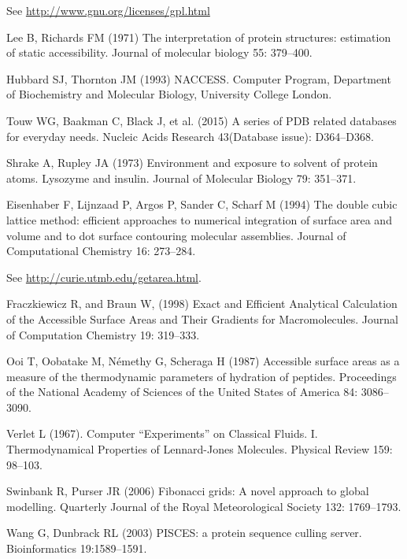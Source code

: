\documentclass[a4paper,11pt]{article}
\begin{document}
\begin{small}
  
\begin{thebibliography}{50}

  See  \url{http://www.gnu.org/licenses/gpl.html}

  Lee B, Richards FM (1971) The interpretation of protein
  structures: estimation of static accessibility. Journal of molecular
  biology 55: 379--400.

  Hubbard SJ, Thornton JM (1993) NACCESS. Computer Program,
  Department of Biochemistry and Molecular Biology, University College
  London.

  Touw WG, Baakman C, Black J, et al. (2015)
  A series of PDB related databases for everyday needs.
  Nucleic Acids Research 43(Database issue): D364--D368.

  Shrake A, Rupley JA (1973) Environment and exposure to
  solvent of protein atoms. Lysozyme and insulin. Journal of Molecular
  Biology 79: 351--371.

  Eisenhaber F, Lijnzaad P, Argos P, Sander C, Scharf M (1994)
  The double cubic lattice method: efficient approaches to numerical
  integration of surface area and volume and to dot surface contouring
  molecular assemblies. Journal of Computational Chemistry 16: 273--284.

  See \url{http://curie.utmb.edu/getarea.html}.

  Fraczkiewicz R, and Braun W, (1998) Exact and Efficient Analytical
  Calculation of the Accessible Surface Areas and Their Gradients for
  Macromolecules. Journal of Computation Chemistry 19: 319--333.

  Ooi T, Oobatake M, Némethy G, Scheraga H (1987)
  Accessible surface areas as a measure of the thermodynamic
  parameters of hydration of peptides. Proceedings of the National
  Academy of Sciences of the United States of America 84: 3086--3090.

  Verlet L (1967). Computer ``Experiments'' on Classical
  Fluids. I. Thermodynamical Properties of Lennard-Jones
  Molecules. Physical Review 159: 98--103.

 Swinbank R, Purser JR (2006) Fibonacci grids:
  A novel approach to global modelling. Quarterly Journal of the Royal
  Meteorological Society 132: 1769--1793.

  Wang G, Dunbrack RL (2003) PISCES: a protein sequence culling server. 
  Bioinformatics 19:1589--1591.


\end{thebibliography}
\end{small}
\end{document}
